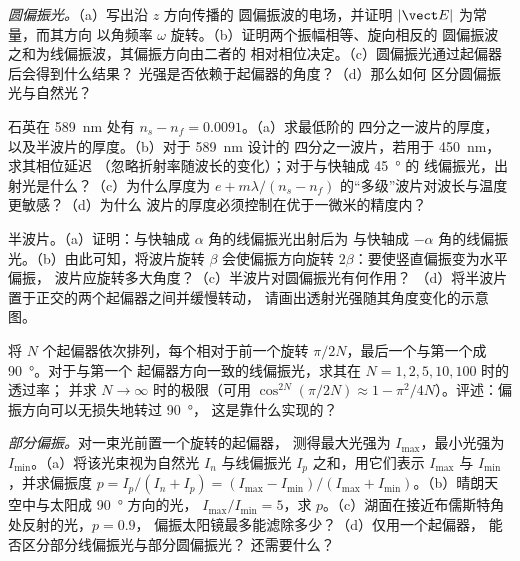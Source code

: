 \begin{exercise}[$\star\star$]\label{exo:b2:plane-waves-polarization:5}
\emph{圆偏振光。}（a）写出沿 $z$ 方向传播的
圆偏振波的电场，并证明 $|\vect E|$ 为常量，而其方向
以角频率 $\omega$ 旋转。（b）证明两个振幅相等、旋向相反的
圆偏振波之和为线偏振波，其偏振方向由二者的
相对相位决定。（c）圆偏振光通过起偏器后会得到什么结果？
光强是否依赖于起偏器的角度？（d）那么如何
区分圆偏振光与自然光？
\end{exercise}

\begin{exercise}[$\star\star$]\label{exo:b2:plane-waves-polarization:6}
石英在 \qty{589}{nm} 处有 $n_s - n_f = 0.0091$。（a）求最低阶的
四分之一波片的厚度，以及半波片的厚度。（b）对于 \qty{589}{nm} 设计的
四分之一波片，若用于 \qty{450}{nm}，求其相位延迟
（忽略折射率随波长的变化）；对于与快轴成 \qty{45}{\degree} 的
线偏振光，出射光是什么？（c）为什么厚度为 $e +
m\lambda/(n_s - n_f)$ 的“多级”波片对波长与温度更敏感？（d）为什么
波片的厚度必须控制在优于一微米的精度内？
\end{exercise}

\begin{exercise}[$\star\star$]\label{exo:b2:plane-waves-polarization:7}
半波片。（a）证明：与快轴成 $\alpha$ 角的线偏振光出射后为
与快轴成 $-\alpha$ 角的线偏振光。（b）由此可知，将波片旋转 $\beta$
会使偏振方向旋转 $2\beta$：要使竖直偏振变为水平偏振，
波片应旋转多大角度？（c）半波片对圆偏振光有何作用？
（d）将半波片置于正交的两个起偏器之间并缓慢转动，
请画出透射光强随其角度变化的示意图。
\end{exercise}

\begin{exercise}[$\star\star$]\label{exo:b2:plane-waves-polarization:8}
将 $N$ 个起偏器依次排列，每个相对于前一个旋转
$\pi/2N$，最后一个与第一个成 \qty{90}{\degree}。对于与第一个
起偏器方向一致的线偏振光，求其在 $N = 1, 2, 5, 10, 100$ 时的透过率；
并求 $N \to \infty$ 时的极限（可用 $\cos^{2N}(\pi/2N) \approx
1 - \pi^2/4N$）。评述：偏振方向可以无损失地转过 \qty{90}{\degree}，
这是靠什么实现的？
\end{exercise}

\begin{exercise}[$\star\star$]\label{exo:b2:plane-waves-polarization:9}
\emph{部分偏振。}对一束光前置一个旋转的起偏器，
测得最大光强为 $I_{\max}$，最小光强为 $I_{\min}$。（a）将该光束视为自然光 $I_n$
与线偏振光 $I_p$ 之和，用它们表示 $I_{\max}$ 与
$I_{\min}$，并求偏振度 $p = I_p/(I_n + I_p) =
(I_{\max} - I_{\min})/(I_{\max} + I_{\min})$。（b）晴朗天空中与太阳成 \qty{90}{\degree} 方向的光，
$I_{\max}/I_{\min} = 5$，求 $p$。（c）湖面在接近布儒斯特角处反射的光，$p = 0.9$，
偏振太阳镜最多能滤除多少？（d）仅用一个起偏器，
能否区分部分线偏振光与部分圆偏振光？
还需要什么？
\end{exercise}


